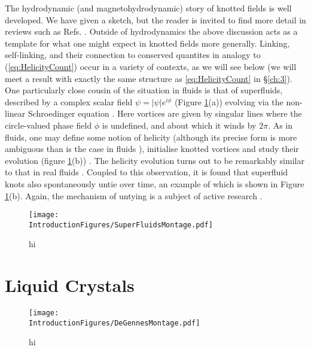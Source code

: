 The hydrodynamic (and magnetohydrodynamic) story of knotted fields is well developed. We have given a sketch, but the reader is invited to find more detail in reviews such as Refs. \cite{Moffat, Irvine}. Outside of hydrodynamics the above discussion acts as a template for what one might expect in knotted fields more generally. Linking, self-linking, and their connection to conserved quantites in analogy to (\ref{eq:HelicityCount}) occur in a variety of contexts, as we will see below (we will meet a result with exactly the same structure as \ref{eq:HelicityCount} in \S \ref{ch:3}). One particularly close cousin of the situation in fluids is that of superfluids, described by a complex scalar field $\psi = |\psi| e^{i \phi}$ (Figure \ref{fig:SuperFluidMontage}(a)) evolving via the non-linear Schroedinger equation \cite{}. Here vortices are given by singular lines where the circle-valued phase field $\phi$ is undefined, and about which it winds by $2\pi$. As in fluids, one may define some notion of helicity (although its precise form is more ambiguous than is the case in fluids \cite{Salman}), initialise knotted vortices and study their evolution (figure \ref{fig:SuperFluidMontage}(b)) \cite{Scheeler}. The helicity evolution turns out to be remarkably similar to that in real fluids \cite{Scheeler}. Coupled to this observation, it is found that superfluid knots also spontaneously untie over time, an example of which is shown in Figure \ref{fig:SuperFluidMontage}(b). Again, the mechanism of untying is a subject of active research \cite{Scheeler}.
\begin{figure}[htbp]
\centering
\texttt{[image: \\IntroductionFigures/SuperFluidsMontage.pdf]}
\caption{hi }
\label{fig:SuperFluidMontage}
\end{figure}

\section{Liquid Crystals}

\begin{figure}[htbp]
\centering
\texttt{[image: \\IntroductionFigures/DeGennesMontage.pdf]}
\caption{hi }
\label{fig:DeGennesMontage}
\end{figure}


